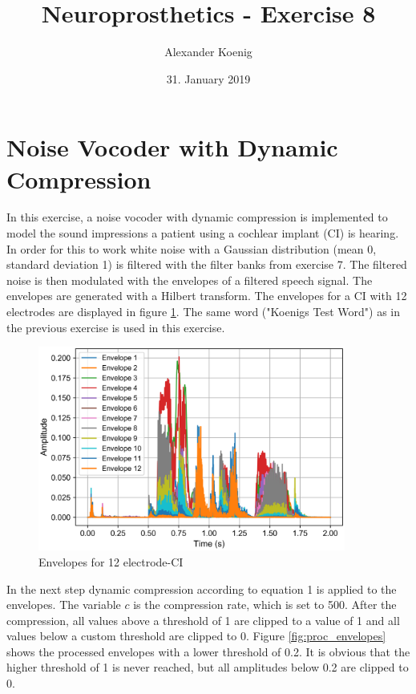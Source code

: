 \documentclass{scrartcl}
\title{Neuroprosthetics - Exercise 8}
\author{Alexander Koenig}
\date{31. January 2019}
\begin{document}
\maketitle

\section{Noise Vocoder with Dynamic Compression}

In this exercise, a noise vocoder with dynamic compression is implemented to model the sound impressions a patient using a cochlear implant (CI) is hearing. In order for this to work white noise with a Gaussian distribution (mean 0, standard deviation 1) is filtered with the filter banks from exercise 7. The filtered noise is then modulated with the envelopes of a filtered speech signal. The envelopes are generated with a Hilbert transform. The envelopes for a CI with 12 electrodes are displayed in figure \ref{fig:envelopes}. The same word ("Koenigs Test Word") as in the previous exercise is used in this exercise. 

\begin{figure}[h]
	\vspace{0.5cm}
	\centering
	\includegraphics[width=0.9\textwidth]{figures/envelopes}
	\caption{Envelopes for 12 electrode-CI}
	\label{fig:envelopes}
\end{figure}

\newpage
In the next step dynamic compression according to equation 1 is applied to the envelopes. The variable $c$ is the compression rate, which is set to 500. After the compression, all values above a threshold of 1 are clipped to a value of 1 and all values below a custom threshold are clipped to 0. Figure \ref{fig:proc_envelopes} shows the processed envelopes with a lower threshold of 0.2. It is obvious that the higher threshold of 1 is never reached, but all amplitudes below 0.2 are clipped to 0.
\end{document}
